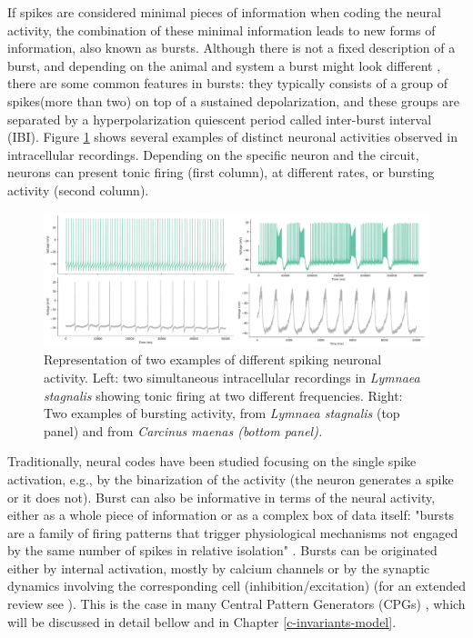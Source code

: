 If spikes are considered minimal pieces of information when coding the neural activity, the combination of these minimal information leads to new forms of information, also known as bursts. Although there is not a fixed description of a burst, and depending on the animal and system a burst might look different \parencite{russell_bursting_1978,palmu_detection_2010,lundqvist_gamma_2016}, there are some common features in bursts: they typically consists of a group of spikes(more than two) on top of a sustained depolarization, and these groups are separated by a hyperpolarization quiescent period called inter-burst interval (IBI). Figure \ref{fig:spike_activity-types} shows several examples of distinct neuronal activities observed in intracellular recordings. Depending on the specific neuron and the circuit, neurons can present tonic firing (first column), at different rates, or bursting activity (second column). 
\begin{figure}[htb!]
    \centering
    \includegraphics[width=\linewidth]{img/intro/spike_activity-types.pdf}
    \caption{Representation of two examples of different spiking neuronal activity. Left: two simultaneous intracellular recordings in \textit{Lymnaea stagnalis} showing tonic firing at two different frequencies. Right: Two examples of bursting activity, from \textit{Lymnaea stagnalis} (top panel) and from \textit{Carcinus maenas (bottom panel).}}
    \label{fig:spike_activity-types}
\end{figure}

Traditionally, neural codes have been studied focusing on the single spike activation, e.g., by the binarization of the activity (the neuron generates a spike or it does not). Burst can also be informative in terms of the neural activity, either as a whole piece of information or as a complex box of data itself: "bursts are a family of firing patterns that trigger physiological mechanisms not engaged by the same number of spikes in relative isolation" \parencite{friedenberger_silences_2023}. Bursts can be originated either by internal activation, mostly by calcium channels or by the synaptic dynamics involving the corresponding cell (inhibition/excitation) (for an extended review see \parencite{friedenberger_silences_2023}). This is the case in many Central Pattern Generators (CPGs) \parencite{Katz,steuer_central_2018}, which will be discussed in detail bellow and in Chapter \ref{c-invariants-model}.

